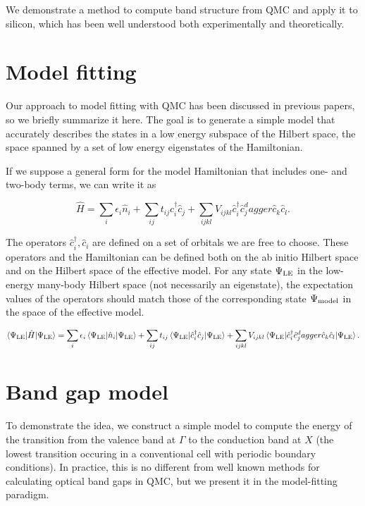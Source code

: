 We demonstrate a method to compute band structure from QMC and apply it to silicon, which has been well understood both experimentally and theoretically.

\section{Model fitting}

Our approach to model fitting with QMC has been discussed in previous papers, so we briefly summarize it here.
The goal is to generate a simple model that accurately describes the states in a low energy subspace of the Hilbert space, the space spanned by a set of low energy eigenstates of the Hamiltonian.

If we suppose a general form for the model Hamiltonian that includes one- and two-body terms, we can write it as

\begin{equation}
\hat{H} = \sum_i \epsilon_i \hat{n}_i + \sum_{ij} t_{ij} \hat{c}_i^\dagger \hat{c}_j + \sum_{ijkl} V_{ijkl} \hat{c}_i^\dagger \hat{c}_j^dagger \hat{c}_k \hat{c}_l.
\end{equation}

The operators $\hat{c}_i^\dagger, \hat{c}_i$ are defined on a set of orbitals we are free to choose.
These operators and the Hamiltonian can be defined both on the ab initio Hilbert space and on the Hilbert space of the effective model.
For any state $\Psi_{\rm LE}$ in the low-energy many-body Hilbert space (not necessarily an eigenstate), the expectation values of the operators should match those of the corresponding state $\Psi_{\rm model}$ in the space of the effective model.

\begin{equation}
\braket{\Psi_{\rm LE} | \hat{H} | \Psi_{\rm LE}} = 
\sum_i \epsilon_i \braket{\Psi_{\rm LE} | \hat{n}_i | \Psi_{\rm LE}} + 
\sum_{ij} t_{ij} \braket{\Psi_{\rm LE} | \hat{c}_i^\dagger \hat{c}_j | \Psi_{\rm LE}} + 
\sum_{ijkl} V_{ijkl} \braket{ \Psi_{\rm LE} | \hat{c}_i^\dagger \hat{c}_j^dagger \hat{c}_k \hat{c}_l | \Psi_{\rm LE}}.
\end{equation}



\section{Band gap model}

To demonstrate the idea, we construct a simple model to compute the energy of the transition from the valence band at $\Gamma$ to the conduction band at $X$ (the lowest transition occuring in a conventional cell with periodic boundary conditions).
In practice, this is no different from well known methods for calculating optical band gaps in QMC, but we present it in the model-fitting paradigm.

